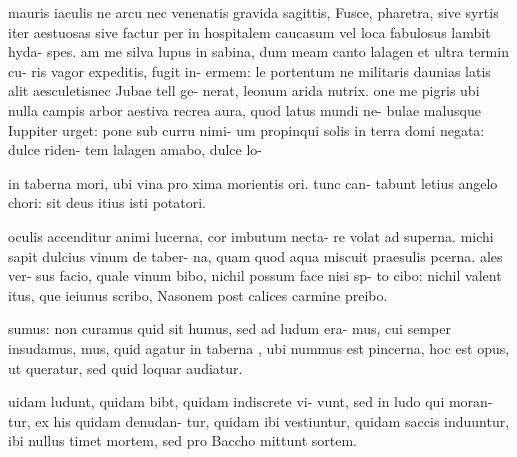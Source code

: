 \documentclass[a4paper, 12pt]{article}
\begin{document}
\newpage
\label{pg_carmina_sample}

\MsAltPunctiationStyle
{}
\begin{mstexturablocks}
mauris iaculis ne arcu nec 
venenatis gravida sagittis, 
Fusce, pharetra, sive  syrtis 
iter aestuosas sive factur {per} 
in hospital{em} caucasum vel  
loca fabulos{us} lambit hyda- 
spes. am me silva lupus 
in sabina, d{um} meam canto 
lalagen et ultra termin cu- 
ris vagor expeditis, fugit in-
ermem: le portentum ne 
militaris daunias latis alit 
aesculetisnec Jubae tell ge- 
nerat, leonum arida nutrix. 
one me pigris ubi nulla 
campis arbor aestiva recrea 
aura, quod latus mundi ne- 
bulae malusque Iuppiter 
urget: p{on}e sub curru nimi- 
um {pro}pin{qui} solis in terra 
{dom}i negata: dulce riden-
tem lalag{en} amabo, dulce lo-

in tabe{rn}a mori, ubi vina {pro}
xima  morientis ori. tunc can-
tabunt leti{us} angelo chori: 
sit {deu}s itius isti potatori.
\strut{}oculis accenditur animi 
lucerna, cor imbutum necta- 
re volat ad superna. michi 
sapit dulcius vin{um} de taber- 
na, {quam} quod aqua miscuit
{prae}sulis pcerna. ales ver-
sus facio, {qua}le vinum bibo,
nichil possum face nisi sp- 
to cibo: nichil valent itus,
{que} ieiunus scribo, Nasonem 
post calices carmine preibo.

sumus: non curam{us} {quid} sit 
humus, sed ad ludum era- 
mus, cui semper insudamus,
mus, quid aga{tur} in taberna
, ubi nu{mm}us est pincerna,
hoc est opus, ut queratur,
sed {quid} loquar audia{tur}.
\strut{}uidam ludunt, {qui}dam
bibt, {qui}dam indiscrete vi-
vunt, {sed} in ludo {qui} moran-
tur, ex his {qui}dam denudan- 
tur, quid{am} ibi vestiun{tur},
quidam saccis induuntur, ibi 
nullus timet mortem, sed
pro Baccho mittunt sortem.
\end{mstexturablocks}

\thispagestyle{empty}
\end{document}
